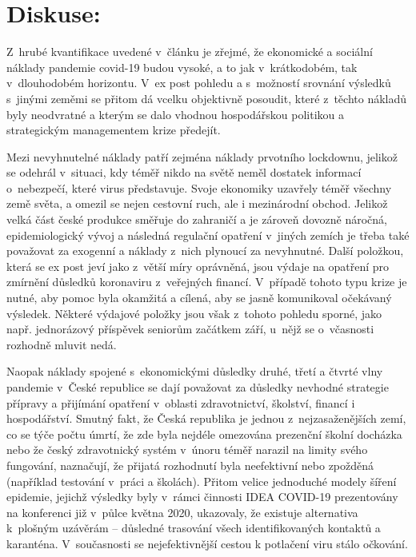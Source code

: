 \section*{Diskuse:} 
Z~hrubé kvantifikace uvedené v~článku je zřejmé, že ekonomické a sociální náklady pandemie covid-19 budou vysoké, a to jak v~krátkodobém, tak v~dlouhodobém horizontu. V~ex post pohledu a s~možností srovnání výsledků s~jinými zeměmi se přitom dá vcelku objektivně posoudit, které z~těchto nákladů byly neodvratné a kterým se dalo vhodnou hospodářskou politikou a strategickým managementem krize předejít.

Mezi nevyhnutelné náklady patří zejména náklady prvotního lockdownu, jelikož se odehrál v~situaci, kdy téměř nikdo na světě neměl dostatek informací o~nebezpečí, které virus představuje. Svoje ekonomiky uzavřely téměř všechny země světa, a omezil se nejen cestovní ruch, ale i mezinárodní obchod. Jelikož velká část české produkce směřuje do zahraničí a je zároveň dovozně náročná, epidemiologický vývoj a následná regulační opatření v~jiných zemích je třeba také považovat za exogenní a náklady z~nich plynoucí za nevyhnutné. Další položkou, která se ex post jeví jako z~větší míry oprávněná, jsou výdaje na opatření pro zmírnění důsledků koronaviru z~veřejných financí. V~případě tohoto typu krize je nutné, aby pomoc byla okamžitá a cílená, aby se jasně komunikoval očekávaný výsledek. Některé výdajové položky jsou však z~tohoto pohledu sporné, jako např. jednorázový příspěvek seniorům začátkem září, u~nějž se o~včasnosti rozhodně mluvit nedá.

Naopak náklady spojené s~ekonomickými důsledky druhé, třetí a čtvrté vlny pandemie v~České republice se dají považovat za důsledky nevhodné strategie přípravy a přijímání opatření v~oblasti zdravotnictví, školství, financí i hospodářství. Smutný fakt, že Česká republika je jednou z~nejzasaženějších zemí, co se týče počtu úmrtí, že zde byla nejdéle omezována prezenční školní docházka nebo že český zdravotnický systém v~únoru téměř narazil na limity svého fungování, naznačují, že přijatá rozhodnutí byla neefektivní nebo zpožděná (například testování v~práci a školách). Přitom velice jednoduché modely šíření epidemie, jejichž výsledky byly v~rámci činnosti IDEA COVID-19 prezentovány na konferenci  již v~půlce května 2020, ukazovaly, že existuje alternativa k~plošným uzávěrám – důsledné trasování všech identifikovaných kontaktů a karanténa. V~současnosti se nejefektivnější cestou k potlačení viru stálo očkování. 
